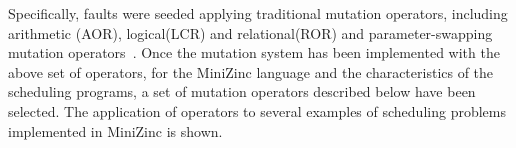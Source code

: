
Specifically, faults were seeded applying traditional mutation operators, including arithmetic (AOR), logical(LCR) and relational(ROR)  and parameter-swapping  mutation operators~\cite{PAPADAKIS2019275}. 
Once the mutation system has been implemented with the above set of operators, for the MiniZinc language and the characteristics of the scheduling programs, a set of mutation operators described below have been selected. The application of  operators to several examples of scheduling problems implemented in MiniZinc is shown.

